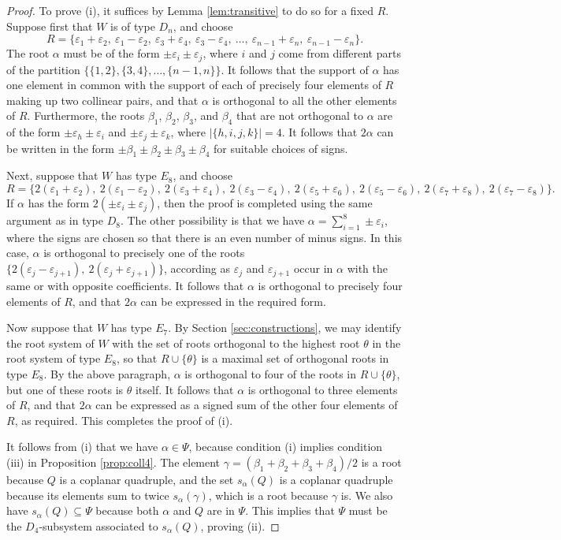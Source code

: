 \documentclass[11pt]{amsart}
\theoremstyle{plain}
\theoremstyle{definition}
\theoremstyle{remark}
\numberwithin{equation}{subsection}
\newcommand{\al}{\alpha}
\newcommand{\be}{\beta}
\newcommand{\ep}{\varepsilon}
\newcommand{\coplanar}{coplanar\xspace}
\newcommand{\se}{\subseteq}
\begin{document}
\begin{proof}
To prove (i), it suffices by Lemma \ref{lem:transitive} to do so for a fixed
$R$.  Suppose first that $W$ is of type $D_n$, and choose $$ R = \{ \ep_1 +
    \ep_2, \ \ep_1 - \ep_2,\ \ep_3 + \ep_4, \ \ep_3 - \ep_4, \ \ldots, \
    \ep_{n-1} + \ep_n, \ \ep_{n-1} - \ep_n \}.$$ The root $\al$ must be of the
    form $\pm \ep_i \pm \ep_j$, where $i$ and $j$ come from different parts of
    the partition $\{\{1, 2\}, \{3, 4\}, \ldots, \{n-1, n\}\}$. It follows that
    the support of $\al$ has one element in common with the support of each of
    precisely four elements of $R$ making up two collinear pairs, and that $\al$
    is orthogonal to all the other elements of $R$.  Furthermore, the roots
    $\be_1$, $\be_2$, $\be_3$, and $\be_4$ that are not orthogonal to $\al$ are
    of the form $\pm \ep_h \pm \ep_i$ and $\pm \ep_j \pm \ep_k$, where $|\{h, i,
    j, k\}| = 4$. It follows that $2\al$ can be written in the form $\pm
    \beta_1\pm\be_2\pm\beta_3\pm\beta_4$ for suitable choices of signs.

Next, suppose that $W$ has type $E_8$, and choose $$ R = \{ 2(\ep_1 + \ep_2), \
2(\ep_1 - \ep_2), \ 2(\ep_3 + \ep_4), \ 2(\ep_3 - \ep_4), \ 2(\ep_5 + \ep_6), \
2(\ep_5 - \ep_6), \ 2(\ep_7 + \ep_8), \ 2(\ep_7 - \ep_8) \}.$$ If $\al$ has the
form $2(\pm \ep_i \pm \ep_j)$, then the proof is completed using the same
argument as in type $D_8$.  The other possibility is that we have $\al = \sum_{i
= 1}^8 \pm \ep_i$, where the signs are chosen so that there is an even number of
minus signs. In this case, $\al$ is orthogonal to precisely one of the roots
$\{2(\ep_j - \ep_{j+1}), \ 2(\ep_j + \ep_{j+1})\}$, according as $\ep_j$ and
$\ep_{j+1}$ occur in $\al$ with the same or with opposite coefficients. It
follows that $\al$ is orthogonal to precisely four elements of $R$, and that $2
\al$ can be expressed in the required form.

Now suppose that $W$ has type $E_7$. By Section \ref{sec:constructions}, we may
identify the root system of $W$ with the set of roots orthogonal to the highest
root $\theta$ in the root system of type $E_8$, so that $R \cup \{\theta\}$ is a
maximal set of orthogonal roots in type $E_8$. By the above paragraph, $\al$ is orthogonal
to four of the roots in $R \cup \{\theta\}$, but one of these roots is $\theta$
itself. It follows that $\al$ is orthogonal to three elements of $R$, and that
$2 \al$ can be expressed as a signed sum of the other four elements of $R$, as
required. This completes the proof of (i).

It follows from (i) that we have $\alpha\in \Psi$, because condition (i) implies
condition (iii) in Proposition \ref{prop:coll4}. The element
$\gamma=(\be_1+\be_2+\be_3+\be_4)/2$ is a root because $Q$ is a coplanar
quadruple, and the set $s_\al(Q)$ is a \coplanar quadruple because its elements
sum to twice $s_\al(\gamma)$, which is a root because $\gamma$ is.  We also have
$s_\al(Q)\se \Psi$ because both $\al$ and $Q$ are in $\Psi$.  This implies that
$\Psi$ must be the $D_4$-subsystem associated to $s_\al(Q)$, proving (ii).
\end{proof}
\end{document}
